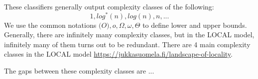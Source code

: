 These classifiers generally output complexity classes of the following:
\[1, log^*(n), log(n), n, ...\]
\todo{}
We use the common notations \(\mathcal(O), o, \Omega, \omega, \Theta \) to define lower and upper bounds.
Generally, there are infinitely many complexity classes, but in the LOCAL model, infinitely many of them turns out to be redundant.
There are 4 main complexity classes in the LOCAL model \url{https://jukkasuomela.fi/landscape-of-locality}.

The gaps between these complexity classes are ... 




